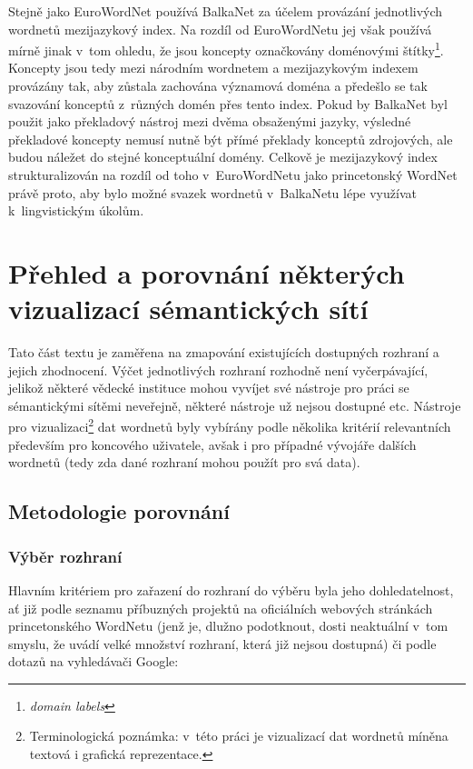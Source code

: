 \documentclass[a4paper,11pt,openany,twoside]{book}
\begin{document}
				Stejně jako EuroWordNet používá BalkaNet za účelem provázání jednotlivých wordnetů mezijazykový index. Na rozdíl od EuroWordNetu jej však používá mírně jinak v~tom ohledu, že jsou koncepty označkovány doménovými štítky\footnote{\textit{domain labels}}. Koncepty jsou tedy mezi národním wordnetem a mezijazykovým indexem provázány tak, aby zůstala zachována významová doména a předešlo se tak svazování konceptů z~různých domén přes tento index. Pokud by BalkaNet byl použit jako překladový nástroj mezi dvěma obsaženými jazyky, výsledné překladové koncepty nemusí nutně být přímé překlady konceptů zdrojových, ale budou náležet do stejné konceptuální domény. \parencite{christodoulakis2002balkanet} Celkově je mezijazykový index strukturalizován na rozdíl od toho v~EuroWordNetu jako princetonský WordNet právě proto, aby bylo možné svazek wordnetů v~BalkaNetu lépe využívat k~lingvistickým úkolům. \parencite{tufis2004balkanet}

	\part{Přehled a porovnání některých vizualizací sémantických sítí}
	\label{part:zwei}

		{\noindent Tato část textu je zaměřena na zmapování existujících dostupných rozhraní a jejich zhodnocení. Výčet jednotlivých rozhraní rozhodně není vyčerpávající, jelikož některé vědecké instituce mohou vyvíjet své nástroje pro práci se sémantickými sítěmi neveřejně, některé nástroje už nejsou dostupné etc. Nástroje pro vizualizaci\footnote{Terminologická poznámka: v~této práci je vizualizací dat wordnetů míněna textová i grafická reprezentace.} dat wordnetů byly vybírány podle několika kritérií relevantních především pro koncového uživatele, avšak i pro případné vývojáře dalších wordnetů (tedy zda dané rozhraní mohou použít pro svá data).}

		\chapter{Metodologie porovnání}

			\section{Výběr rozhraní}

				Hlavním kritériem pro zařazení do rozhraní do výběru byla jeho dohledatelnost, ať již podle seznamu příbuzných projektů na oficiálních webových stránkách princetonského WordNetu \parencite{princetonWN} (jenž je, dlužno podotknout, dosti neaktuální v~tom smyslu, že uvádí velké množství rozhraní, která již nejsou dostupná) či podle dotazů na vyhledávači Google:
\end{document}
